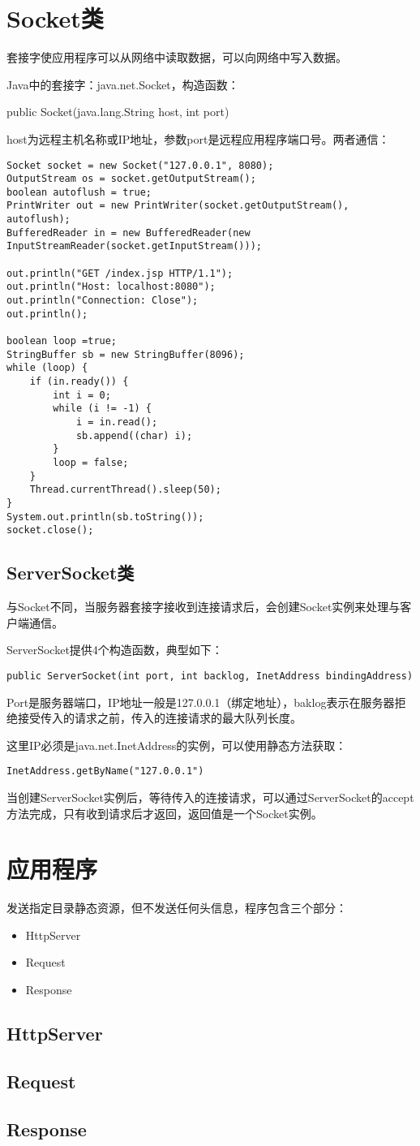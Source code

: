 \section{Socket类}
套接字使应用程序可以从网络中读取数据，可以向网络中写入数据。
\par Java中的套接字：java.net.Socket，构造函数：
\par \qquad public Socket(java.lang.String host, int port)
\par host为远程主机名称或IP地址，参数port是远程应用程序端口号。两者通信：
\begin{lstlisting}
Socket socket = new Socket("127.0.0.1", 8080);
OutputStream os = socket.getOutputStream();
boolean autoflush = true;
PrintWriter out = new PrintWriter(socket.getOutputStream(), autoflush);
BufferedReader in = new BufferedReader(new InputStreamReader(socket.getInputStream()));

out.println("GET /index.jsp HTTP/1.1");
out.println("Host: localhost:8080");
out.println("Connection: Close");
out.println();

boolean loop =true;
StringBuffer sb = new StringBuffer(8096);
while (loop) {
	if (in.ready()) {
		int i = 0;
		while (i != -1) {
			i = in.read();
			sb.append((char) i);
		}
		loop = false;
	}
	Thread.currentThread().sleep(50);
}
System.out.println(sb.toString());
socket.close();
\end{lstlisting}
\subsection{ServerSocket类}
与Socket不同，当服务器套接字接收到连接请求后，会创建Socket实例来处理与客户端通信。
\par ServerSocket提供4个构造函数，典型如下：
\begin{lstlisting}
public ServerSocket(int port, int backlog, InetAddress bindingAddress)
\end{lstlisting}
Port是服务器端口，IP地址一般是127.0.0.1（绑定地址），baklog表示在服务器拒绝接受传入的请求之前，传入的连接请求的最大队列长度。
\par 这里IP必须是java.net.InetAddress的实例，可以使用静态方法获取：
\begin{lstlisting}
InetAddress.getByName("127.0.0.1")
\end{lstlisting}
当创建ServerSocket实例后，等待传入的连接请求，可以通过ServerSocket的accept方法完成，只有收到请求后才返回，返回值是一个Socket实例。
\section{应用程序}
发送指定目录静态资源，但不发送任何头信息，程序包含三个部分：
\begin{itemize}
	\item HttpServer
	\item Request
	\item Response
\end{itemize}
\subsection{HttpServer}

\subsection{Request}
\subsection{Response}